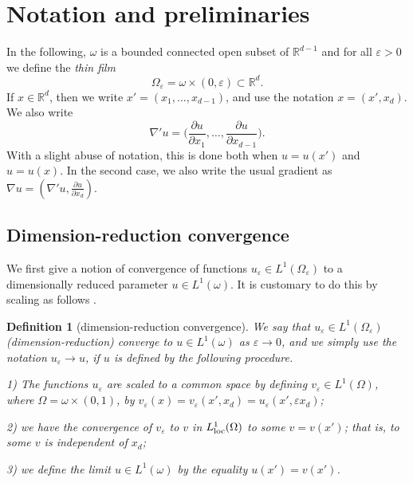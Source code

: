 \documentclass{article}
\newtheorem{definition}[lemma]{Definition}
\newcommand{\e}{\varepsilon}
\begin{document}


\section{Notation and preliminaries}
In the following, $\omega$ is a bounded connected open subset of $\mathbb R^{d-1}$ and for all $\e>0$
we define the {\em thin film}
$$
\Omega_\e=\omega\times (0,\e)\subset \mathbb R^d.
$$
If $x\in\mathbb R^d$, then we write $x'=(x_1,\ldots, x_{d-1})$, and use the notation $x=(x',x_d)$.
We also write 
$$
\nabla'u=\Big(\frac{\partial u}{\partial x_1},\ldots, \frac{\partial u}{\partial x_{d-1}}\Big).
$$
With a slight abuse of notation, this is done both when $u=u(x')$ and $u=u(x)$. In the second case, we also write the usual gradient as $\nabla u=(\nabla'u, \tfrac{\partial u}{\partial x_d})$.

\subsection{Dimension-reduction convergence}
We first give a notion of convergence of functions $u_\e\in L^1(\Omega_\e)$ to a dimensionally reduced parameter $u\in L^1(\omega)$. It is customary to do this by scaling as follows \cite{LDR,BFF}.

\begin{definition}[dimension-reduction convergence]
We say that $u_\e\in L^1(\Omega_\e)$ {\em (di\-men\-sion-reduction) converge} to $u\in L^1(\omega)$ as $\e\to0$, and we simply use the notation $u_\e\to u$, if $u$ is defined by the following procedure.
 
{\rm1)} The functions $u_\e$ are scaled to a common space by defining $v_\e\in L^1(\Omega)$, where $\Omega=\omega\times(0,1)$, by $v_\e(x)=v_\e(x',x_d)= u_\e(x',\e x_d)$;

{\rm2)} we have the convergence of $v_\e$ to $v$ in $L^1_{\rm loc}(\Omega)$ to some $v=v(x')$; that is, to some $v$  is independent of $x_d$;

{\rm3)} we define the limit $u\in L^1(\omega)$ by the equality $u(x')=v(x')$. 
\end{definition}
\end{document}
